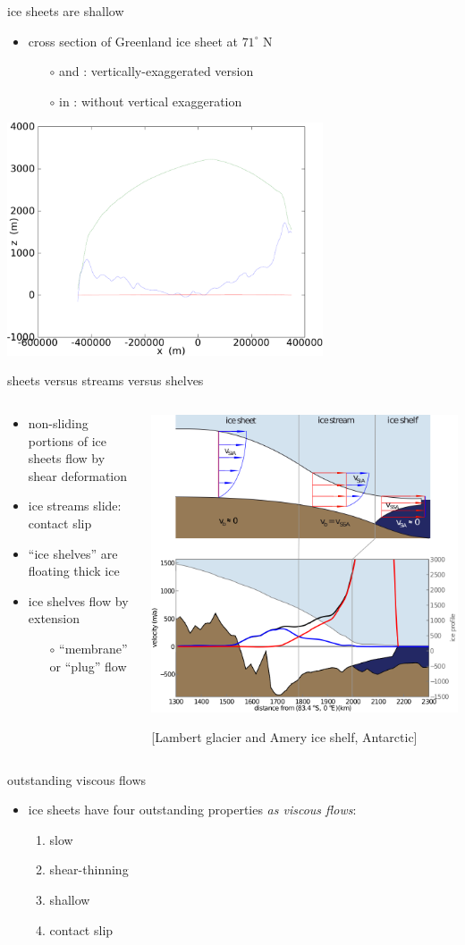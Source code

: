 \documentclass{beamer}
\newcommand{\contactslipslide}{
\begin{frame}{sheets versus streams versus shelves}

\begin{columns}
\begin{column}{0.35\textwidth}
\small
\begin{itemize}
\small
\item non-sliding portions of ice sheets flow by shear deformation
\item ice streams slide: \alert{contact slip}
\item ``ice shelves'' are floating thick ice
\item ice shelves flow by extension
  \begin{itemize}
  \scriptsize
  \item[$\circ$] ``membrane'' or ``plug'' flow
  \end{itemize}
\end{itemize}
\end{column}

\begin{column}{0.65\textwidth}
\includegraphics[width=1.1\textwidth]{siassacartoon-lambert}

\begin{center}
\vspace{-0.18in}
\tiny [Lambert glacier and Amery ice shelf, Antarctic]
\end{center}
\end{column}
\end{columns}
\end{frame}
}
\begin{document}
\begin{frame}{ice sheets are shallow}

\vspace{-0.2in}
\small
\begin{itemize}
\item cross section of Greenland ice sheet at $71^\circ$ N
  \begin{itemize}
  \item[$\circ$] {\color{dark green}{green}} and {\color{dark blue}{blue}}: vertically-exaggerated version
  \item[$\circ$] in {\color{dark red}{red}}: without vertical exaggeration
  \end{itemize}
\end{itemize}
\normalsize

  \begin{center}
    \includegraphics[width=0.7\textwidth]{greentrans}
  \end{center}
\end{frame}


\contactslipslide


\begin{frame}{outstanding viscous flows}

\begin{itemize}
\item ice sheets have four outstanding properties \emph{as viscous flows}:
  \begin{enumerate}
  \item \alert{slow}
  \item \alert{shear-thinning}
  \item \alert{shallow}
  \item \alert{contact slip}
  \end{enumerate}
\end{itemize}
\end{frame}
\end{document}
